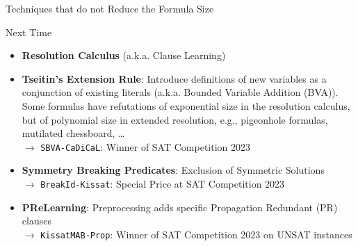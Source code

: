 \documentclass[t]{sdqbeamer}
\begin{document}
\begin{frame}{Techniques that do not Reduce the Formula Size}
\begin{block}{Next Time}
\begin{itemize}\setlength{\itemsep}{1em}
\item \textbf{Resolution Calculus} (a.k.a. Clause Learning)
\item \textbf{Tseitin's Extension Rule}: Introduce definitions of new variables as a conjunction of existing literals (a.k.a. Bounded Variable Addition (BVA)). Some formulas have refutations of exponential size in the resolution calculus, but of polynomial size in extended resolution, e.g., pigeonhole formulas, mutilated chessboard, \dots\\[1ex]
$\bm\rightarrow$ \texttt{SBVA-CaDiCaL}: Winner of SAT Competition 2023
\item \textbf{Symmetry Breaking Predicates}: Exclusion of Symmetric Solutions\\[1ex]
$\bm\rightarrow$ \texttt{BreakId-Kissat}: Special Price at SAT Competition 2023
\item \textbf{PReLearning}: Preprocessing adds specific Propagation Redundant (PR) clauses\\[1ex]
$\bm\rightarrow$ \texttt{KissatMAB-Prop}: Winner of SAT Competition 2023 on UNSAT instances
\end{itemize}
\end{block}
\end{frame}


\end{document}
